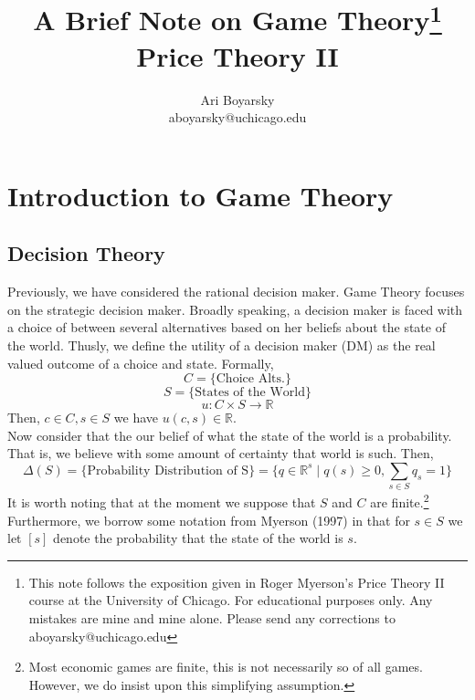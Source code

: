 \documentclass[dvips,11pt]{article}
\newcommand{\R}{\mathbb{R}}
\DeclareMathOperator{\?}{\,?\,}
\begin{document}

\title{A Brief Note on Game Theory\footnote{This note follows the exposition given in Roger Myerson's Price Theory II course at the University of Chicago. For educational purposes only. Any mistakes are mine and mine alone. Please send any corrections to aboyarsky@uchicago.edu} \\ Price Theory II}
\author{Ari Boyarsky \\ aboyarsky@uchicago.edu}

\maketitle

\section{Introduction to Game Theory}
\subsection{Decision Theory}
Previously, we have considered the rational decision maker. Game Theory focuses on the strategic decision maker. Broadly speaking, a decision maker is faced with a choice of between several alternatives based on her beliefs about the state of the world. Thusly, we define the utility of a decision maker (DM) as the real valued outcome of a choice and state. Formally, 
$$C = \{\text{Choice Alts.}\}$$
$$S = \{\text{States of the World}\}$$
$$u: C \times S \rightarrow \R$$
Then, $c \in C, s \in S$ we have $u(c,s) \in \R$.
\\ Now consider that the our belief of what the state of the world is a probability. That is, we believe with some amount of certainty that world is such. Then,
$$\Delta(S)  = \{\text{Probability Distribution of S}\} = \{q \in \R^s \mid q(s) \geq 0, \sum_{s\in S} q_s = 1\}$$
It is worth noting that at the moment we suppose that $S$ and $C$ are finite.\footnote{Most economic games are finite, this is not necessarily so of all games. However, we do insist upon this simplifying assumption.} Furthermore, we borrow some notation from Myerson (1997) in that for $s \in S$ we let $[s]$ denote the probability that the state of the world is $s$. 
\end{document}
